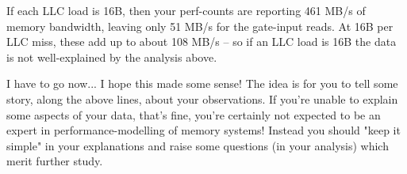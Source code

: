 If each LLC load is 16B, then your perf-counts are reporting 461 MB/s of memory bandwidth, leaving only 51 MB/s for the gate-input reads.  At 16B per LLC miss, these add up to about 108 MB/s -- so if an LLC load is 16B the data is not well-explained by the analysis above.

I have to go now... I hope this made some sense!  The idea is for you to tell some story, along the above lines, about your observations.  If you're unable to explain some aspects of your data, that's fine, you're certainly not expected to be an expert in performance-modelling of memory systems!  Instead you should "keep it simple" in your explanations and raise some questions (in your analysis) which merit further study.